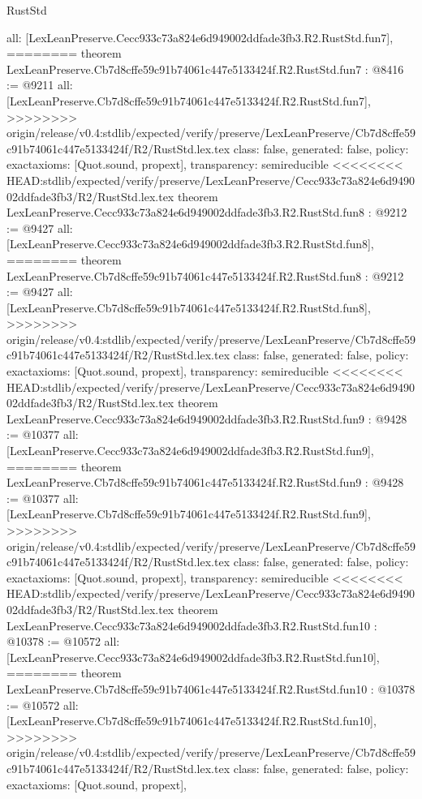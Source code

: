 \begin{lexlean}{RustStd}
\begin{coremodule}
{\begin{coremodule}
{{{{{{{{{{  all: [LexLeanPreserve.Cecc933c73a824e6d949002ddfade3fb3.R2.RustStd.fun7],
========
theorem LexLeanPreserve.Cb7d8cffe59c91b74061c447e5133424f.R2.RustStd.fun7 : @8416 := @9211 {
  all: [LexLeanPreserve.Cb7d8cffe59c91b74061c447e5133424f.R2.RustStd.fun7],
>>>>>>>> origin/release/v0.4:stdlib/expected/verify/preserve/LexLeanPreserve/Cb7d8cffe59c91b74061c447e5133424f/R2/RustStd.lex.tex
  class: false,
  generated: false,
  policy: exact{axioms: [Quot.sound, propext]},
  transparency: semireducible
}
<<<<<<<< HEAD:stdlib/expected/verify/preserve/LexLeanPreserve/Cecc933c73a824e6d949002ddfade3fb3/R2/RustStd.lex.tex
theorem LexLeanPreserve.Cecc933c73a824e6d949002ddfade3fb3.R2.RustStd.fun8 : @9212 := @9427 {
  all: [LexLeanPreserve.Cecc933c73a824e6d949002ddfade3fb3.R2.RustStd.fun8],
========
theorem LexLeanPreserve.Cb7d8cffe59c91b74061c447e5133424f.R2.RustStd.fun8 : @9212 := @9427 {
  all: [LexLeanPreserve.Cb7d8cffe59c91b74061c447e5133424f.R2.RustStd.fun8],
>>>>>>>> origin/release/v0.4:stdlib/expected/verify/preserve/LexLeanPreserve/Cb7d8cffe59c91b74061c447e5133424f/R2/RustStd.lex.tex
  class: false,
  generated: false,
  policy: exact{axioms: [Quot.sound, propext]},
  transparency: semireducible
}
<<<<<<<< HEAD:stdlib/expected/verify/preserve/LexLeanPreserve/Cecc933c73a824e6d949002ddfade3fb3/R2/RustStd.lex.tex
theorem LexLeanPreserve.Cecc933c73a824e6d949002ddfade3fb3.R2.RustStd.fun9 : @9428 := @10377 {
  all: [LexLeanPreserve.Cecc933c73a824e6d949002ddfade3fb3.R2.RustStd.fun9],
========
theorem LexLeanPreserve.Cb7d8cffe59c91b74061c447e5133424f.R2.RustStd.fun9 : @9428 := @10377 {
  all: [LexLeanPreserve.Cb7d8cffe59c91b74061c447e5133424f.R2.RustStd.fun9],
>>>>>>>> origin/release/v0.4:stdlib/expected/verify/preserve/LexLeanPreserve/Cb7d8cffe59c91b74061c447e5133424f/R2/RustStd.lex.tex
  class: false,
  generated: false,
  policy: exact{axioms: [Quot.sound, propext]},
  transparency: semireducible
}
<<<<<<<< HEAD:stdlib/expected/verify/preserve/LexLeanPreserve/Cecc933c73a824e6d949002ddfade3fb3/R2/RustStd.lex.tex
theorem LexLeanPreserve.Cecc933c73a824e6d949002ddfade3fb3.R2.RustStd.fun10 : @10378 := @10572 {
  all: [LexLeanPreserve.Cecc933c73a824e6d949002ddfade3fb3.R2.RustStd.fun10],
========
theorem LexLeanPreserve.Cb7d8cffe59c91b74061c447e5133424f.R2.RustStd.fun10 : @10378 := @10572 {
  all: [LexLeanPreserve.Cb7d8cffe59c91b74061c447e5133424f.R2.RustStd.fun10],
>>>>>>>> origin/release/v0.4:stdlib/expected/verify/preserve/LexLeanPreserve/Cb7d8cffe59c91b74061c447e5133424f/R2/RustStd.lex.tex
  class: false,
  generated: false,
  policy: exact{axioms: [Quot.sound, propext]},
}}}}}}}}}}}}}}
\end{coremodule}}
\end{coremodule}
\end{lexlean}
